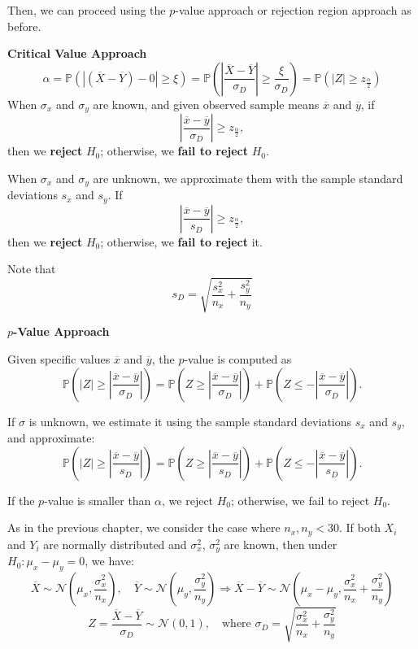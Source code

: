Then, we can proceed using the \(p\)-value approach or rejection region approach as before.

\textbf{Critical Value Approach}
\[
  \alpha = \mathbb{P} \left( \left| \left( \overline{X} - \overline{Y} \right) - 0 \right| \geq \xi \right)
  = \mathbb{P} \left( \left| \frac{\overline{X} - \overline{Y}}{\sigma_D} \right| \geq \frac{\xi}{\sigma_D} \right)
  = \mathbb{P} \left( \left| Z \right| \geq z_{\frac{\alpha}{2}} \right)
\]
When \(\sigma_x\) and \(\sigma_y\) are known, and given observed sample means \(\overline{x}\) and \(\overline{y}\), if
\[
  \left| \frac{\overline{x} - \overline{y}}{\sigma_D} \right| \geq z_{\frac{\alpha}{2}},
\]
then we \textbf{reject} \(H_0\); otherwise, we \textbf{fail to reject} \(H_0\).

When \(\sigma_x\) and \(\sigma_y\) are unknown, we approximate them with the sample standard deviations \(s_x\) and \(s_y\). If
\[
  \left| \frac{\overline{x} - \overline{y}}{s_D} \right| \geq z_{\frac{\alpha}{2}},
\]
then we \textbf{reject} \(H_0\); otherwise, we \textbf{fail to reject} it.

Note that
\[
  s_D = \sqrt{ \frac{s_x^2}{n_x} + \frac{s_y^2}{n_y} }
\]

\textbf{\(p\)-Value Approach}

Given specific values \(\overline{x}\) and \(\overline{y}\), the \(p\)-value is computed as
\[
  \mathbb{P}\left( \left| Z \right| \geq \left| \frac{\overline{x} - \overline{y}}{\sigma_D} \right| \right)
  = \mathbb{P}\left( Z \geq \left| \frac{\overline{x} - \overline{y}}{\sigma_D} \right| \right)
  + \mathbb{P}\left( Z \leq -\left| \frac{\overline{x} - \overline{y}}{\sigma_D} \right| \right).
\]

If \(\sigma\) is unknown, we estimate it using the sample standard deviations \(s_x\) and \(s_y\), and approximate:
\[
  \mathbb{P}\left( \left| Z \right| \geq \left| \frac{\overline{x} - \overline{y}}{s_D} \right| \right)
  = \mathbb{P}\left( Z \geq \left| \frac{\overline{x} - \overline{y}}{s_D} \right| \right)
  + \mathbb{P}\left( Z \leq -\left| \frac{\overline{x} - \overline{y}}{s_D} \right| \right).
\]

If the \(p\)-value is smaller than \(\alpha\), we reject \(H_0\); otherwise, we fail to reject \(H_0\).

As in the previous chapter, we consider the case where \(n_x, n_y < 30\). If both \(X_i\) and \(Y_i\) are normally distributed and \(\sigma_x^2\), \(\sigma_y^2\) are known, then under \(H_0: \mu_x - \mu_y = 0\), we have:
\[
  \overline{X} \sim \mathcal{N} \left( \mu_x, \frac{\sigma_x^2}{n_x} \right), \quad
  \overline{Y} \sim \mathcal{N} \left( \mu_y, \frac{\sigma_y^2}{n_y} \right)
  \Rightarrow \overline{X} - \overline{Y} \sim \mathcal{N} \left( \mu_x - \mu_y, \frac{\sigma_x^2}{n_x} + \frac{\sigma_y^2}{n_y} \right)
\]
\[
  Z = \frac{\overline{X} - \overline{Y}}{\sigma_D} \sim \mathcal{N}(0, 1),
  \quad \text{where } \sigma_D = \sqrt{ \frac{\sigma_x^2}{n_x} + \frac{\sigma_y^2}{n_y} }
\]

